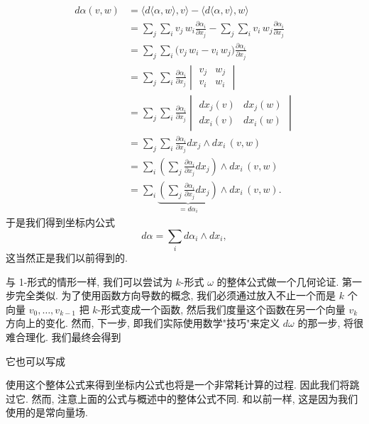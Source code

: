 \begin{align*}
d\alpha(v,w)&=\bigl\langle d\langle\alpha,w\rangle,v\bigr\rangle-\bigl\langle d\langle\alpha,v\rangle,w\bigr\rangle\\
&=\sum_j\sum_i v_j\,w_i\frac{\partial\alpha_i}{\partial x_j}
-\sum_j\sum_i v_i\,w_j\frac{\partial\alpha_i}{\partial x_j}\\
&=\sum_j\sum_i\bigl(v_j\,w_i-v_i\,w_j\bigr)\frac{\partial\alpha_i}{\partial x_j}\\
&=\sum_j\sum_i\frac{\partial\alpha_i}{\partial x_j}
\begin{vmatrix}v_j&w_j\\v_i&w_i\end{vmatrix}\\
&=\sum_j\sum_i\frac{\partial\alpha_i}{\partial x_j}
\begin{vmatrix}dx_j(v)&dx_j(w)\\dx_i(v)&dx_i(w)\end{vmatrix}\\
&=\sum_j\sum_i\frac{\partial\alpha_i}{\partial x_j}dx_j\wedge dx_i\,(v,w)\\
&=\sum_i\left(\sum_j\frac{\partial\alpha_i}{\partial x_j}dx_j\right)\wedge dx_i\,(v,w)\\
&=\sum_i\underbrace{\left(\sum_j\frac{\partial\alpha_i}{\partial x_j}dx_j\right)}_{=d\alpha_i}\wedge dx_i\,(v,w).
\end{align*}
于是我们得到坐标内公式
\[
d\alpha=\sum_i d\alpha_i\wedge dx_i,
\]
这当然正是我们以前得到的.

与 1-形式的情形一样, 我们可以尝试为 $k$-形式 $\omega$ 的整体公式做一个几何论证. 第一步完全类似. 为了使用函数方向导数的概念, 我们必须通过放入不止一个而是 $k$ 个向量 $v_0,\ldots,v_{k-1}$ 把 $k$-形式变成一个函数, 然后我们度量这个函数在另一个向量 $v_k$ 方向上的变化. 然而, 下一步, 即我们实际使用数学"技巧"来定义 $d\omega$ 的那一步, 将很难合理化. 我们最终会得到
\begin{center}
\end{center}
它也可以写成
\begin{center}
\end{center}
使用这个整体公式来得到坐标内公式也将是一个非常耗计算的过程. 因此我们将跳过它. 然而, 注意上面的公式与概述中的整体公式不同. 和以前一样, 这是因为我们使用的是常向量场.

